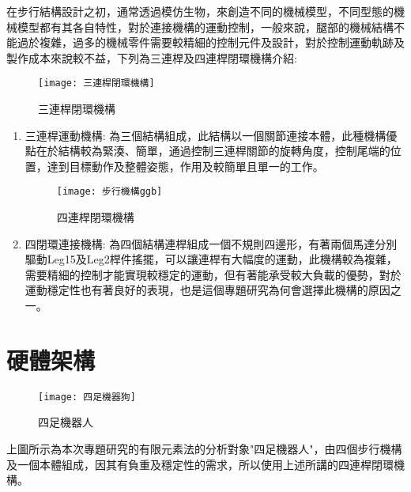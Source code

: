 在步行結構設計之初，通常透過模仿生物，來創造不同的機械模型，不同型態的機械模型都有其各自特性，對於連接機構的運動控制，一般來說，腿部的機械結構不能過於複雜，過多的機械零件需要較精細的控制元件及設計，對於控制運動軌跡及製作成本來說較不益，下列為三連桿及四連桿閉環機構介紹:\
\begin{figure}[hbt!]
\begin{center}
\texttt{[image: 三連桿閉環機構]}
\caption{\Large 三連桿閉環機構}\label{三連桿閉環機構}
\end{center}
\end{figure}
\begin{enumerate}
\item 三連桿運動機構:
為三個結構組成，此結構以一個關節連接本體，此種機構優點在於結構較為緊湊、簡單，通過控制三連桿關節的旋轉角度，控制尾端的位置，達到目標動作及整體姿態，作用及較簡單且單一的工作。\
\newpage

\begin{figure}[hbt!]
\begin{center}
\texttt{[image: 步行機構ggb]}
\caption{\Large 四連桿閉環機構}\label{步行機構ggb}
\end{center}
\end{figure}
\item 四閉環連接機構:
為四個結構連桿組成一個不規則四邊形，有著兩個馬達分別驅動Leg15及Leg2桿件搖擺，可以讓連桿有大幅度的運動，此機構較為複雜，需要精細的控制才能實現較穩定的運動，但有著能承受較大負載的優勢，對於運動穩定性也有著良好的表現，也是這個專題研究為何會選擇此機構的原因之一。
\end{enumerate}
\newpage

\section{硬體架構}

\begin{figure}[hbt!]
\begin{center}
\texttt{[image: 四足機器狗]}
\caption{\Large 四足機器人}\label{四足機器狗}
\end{center}
\end{figure}
上圖所示為本次專題研究的有限元素法的分析對象"四足機器人"，由四個步行機構及一個本體組成，因其有負重及穩定性的需求，所以使用上述所講的四連桿閉環機構。\\

